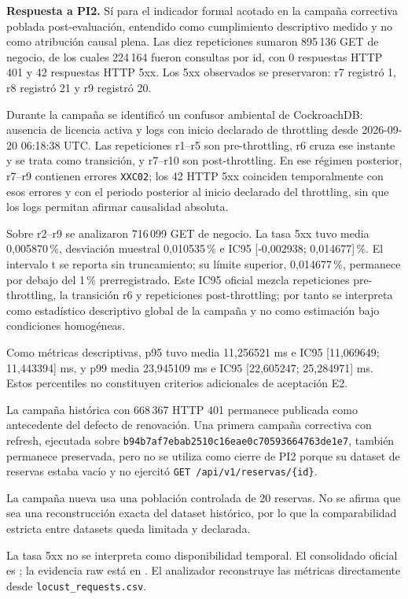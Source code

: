 \textbf{Respuesta a PI2.} Sí para el indicador formal acotado en la
campaña correctiva poblada post-evaluación, entendido como cumplimiento
descriptivo medido y no como atribución causal plena. Las diez repeticiones sumaron
895\,136 GET de negocio, de los cuales 224\,164 fueron consultas por id, con
0 respuestas HTTP 401 y 42 respuestas HTTP 5xx. Los 5xx observados se
preservaron: r7 registró 1, r8 registró 21 y r9 registró 20.

Durante la campaña se identificó un confusor ambiental de CockroachDB: ausencia
de licencia activa y logs con inicio declarado de throttling desde
2026-09-20 06:18:38 UTC. Las repeticiones r1--r5 son pre-throttling, r6 cruza
ese instante y se trata como transición, y r7--r10 son post-throttling. En ese
régimen posterior, r7--r9 contienen errores \texttt{XXC02}; los 42 HTTP 5xx
coinciden temporalmente con esos errores y con el periodo posterior al inicio
declarado del throttling, sin que los logs permitan afirmar causalidad absoluta.

Sobre r2--r9 se analizaron 716\,099 GET de negocio. La tasa 5xx tuvo media
0,005870\,\%, desviación muestral 0,010535\,\% e IC95
[-0,002938; 0,014677]\,\%. El intervalo t se reporta sin truncamiento;
su límite superior, 0,014677\,\%, permanece por debajo del 1\,\%
prerregistrado. Este IC95 oficial mezcla repeticiones pre-throttling, la
transición r6 y repeticiones post-throttling; por tanto se interpreta como
estadístico descriptivo global de la campaña y no como estimación bajo
condiciones homogéneas.

Como métricas descriptivas, p95 tuvo media 11,256521 ms e IC95
[11,069649; 11,443394] ms, y p99 media 23,945109 ms e IC95
[22,605247; 25,284971] ms. Estos percentiles no constituyen criterios
adicionales de aceptación E2.

La campaña histórica con 668\,367 HTTP 401 permanece publicada como
antecedente del defecto de renovación. Una primera campaña correctiva con
refresh, ejecutada sobre \texttt{b94b7af7ebab2510c16eae0c70593664763de1e7},
también permanece preservada, pero no se utiliza como cierre de PI2 porque su
dataset de reservas estaba vacío y no ejercitó
\texttt{GET /api/v1/reservas/\{id\}}.

La campaña nueva usa una población controlada de 20 reservas. No se afirma que
sea una reconstrucción exacta del dataset histórico, por lo que la
comparabilidad estricta entre datasets queda limitada y declarada.

La tasa 5xx no se interpreta como disponibilidad temporal. El consolidado
oficial es
;
la evidencia raw está en
.
El analizador reconstruye las métricas directamente desde
\texttt{locust\_requests.csv}.

